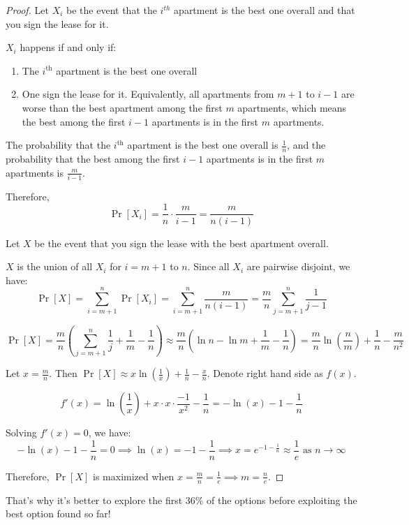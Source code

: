 \begin{proof}
	Let $X_i$ be the event that the $i^{th}$ apartment is the best one overall and that you sign the lease for it.

	$X_i$ happens if and only if:
	\begin{enumerate}
		\item The $i^{\text{th}}$ apartment is the best one overall
		\item One sign the lease for it. Equivalently, all apartments from $m+1$ to $i-1$ are worse than the best apartment among the first $m$ apartments, which means the best among the first $i-1$ apartments is in the first $m$ apartments.
	\end{enumerate}

	The probability that the $i^{\text{th}}$ apartment is the best one overall is $\frac{1}{n}$, and the probability that the best among the first $i-1$ apartments is in the first $m$ apartments is $\frac{m}{i-1}$.

	Therefore, \[
		\Pr[X_i] = \frac{1}{n} \cdot \frac{m}{i-1} = \frac{m}{n(i-1)}
	\]

	Let $X$ be the event that you sign the lease with the best apartment overall.

	$X$ is the union of all $X_i$ for $i=m+1$ to $n$. Since all $X_i$ are pairwise disjoint, we have:
	\[
		\Pr[X] = \sum_{i=m+1}^{n} \Pr[X_i] = \sum_{i=m+1}^{n} \frac{m}{n(i-1)} = \frac{m}{n} \sum_{j=m+1}^{n} \frac{1}{j-1}
	\]

	\[
		\Pr[X] = \frac{m}{n} (\sum_{j=m+1}^{n} \frac{1}{j} + \frac{1}{m} - \frac{1}{n}) \approx \frac{m}{n} (\ln n - \ln m + \frac{1}{m} - \frac{1}{n}) = \frac{m}{n} \ln(\frac{n}{m}) + \frac{1}{n} - \frac{m}{n^2}
	\]

	Let $x = \frac{m}{n}$. Then $\Pr[X] \approx x \ln(\frac{1}{x}) + \frac{1}{n} - \frac{x}{n}$. Denote right hand side as $f(x)$.

	\[
		f'(x) = \ln(\frac{1}{x}) + x \cdot x \cdot \frac{-1}{x^2} - \frac{1}{n} = -\ln(x) - 1 - \frac{1}{n}
	\]

	Solving $f'(x) = 0$, we have:
	\[
		-\ln(x) - 1 - \frac{1}{n} = 0 \implies \ln(x) = -1 - \frac{1}{n} \implies x = e^{-1 - \frac{1}{n}} \approx \frac{1}{e} \text{ as } n \rightarrow \infty
	\]

	Therefore, $\Pr[X]$ is maximized when $x = \frac{m}{n} = \frac{1}{e} \implies m = \frac{n}{e}$.
\end{proof}

That's why it's better to explore the first $36\%$ of the options before exploiting the best option found so far!

